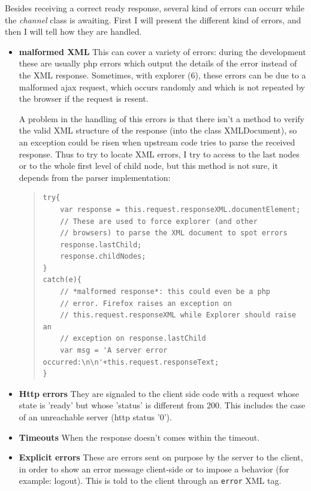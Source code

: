 \documentclass[10pt,a4paper,english]{book}
\begin{document}
Besides receiving a correct ready response, several kind of errors can
occurr while the \emph{channel} class is awaiting. First I will present the
different kind of errors, and then I will tell how they are handled.
\begin{itemize}
\item {} 
\textbf{malformed XML} This can cover a variety of errors: during the development these are
usually php errors which output the details of the error instead of
the XML response. Sometimes, with explorer (6), these errors can be due
to a malformed ajax request, which occurs randomly and which is not
repeated by the browser if the request is resent.

A problem in the handling of this errors is that there isn't a
method to verify the valid XML structure of the response (into the
class XMLDocument), so an exception could be risen when upstream
code tries to parse the received response. Thus to try to locate XML
errors, I try to access to the last nodes or to the whole first
level of child node, but this method is not sure, it depends from
the parser implementation:
\begin{quote}\begin{verbatim}
try{
    var response = this.request.responseXML.documentElement;
    // These are used to force explorer (and other
    // browsers) to parse the XML document to spot errors
    response.lastChild;
    response.childNodes;
}
catch(e){
    // *malformed response*: this could even be a php
    // error. Firefox raises an exception on
    // this.request.responseXML while Explorer should raise an
    // exception on response.lastChild
    var msg = 'A server error occurred:\n\n'+this.request.responseText;
}
\end{verbatim}
\end{quote}

\item {} 
\textbf{Http errors} They are signaled to the client side code with a request whose state
is 'ready' but whose 'status' is different from 200. This includes
the case of an unreachable server (http status '0').

\item {} 
\textbf{Timeouts} When the response doesn't comes within the timeout.

\item {} 
\textbf{Explicit errors} These are errors sent on purpose by the server
to the client, in order to show an error message client-side or to
impose a behavior (for example: logout). This is told to the client
through an \texttt{error} XML tag.

\end{itemize}
\end{document}

